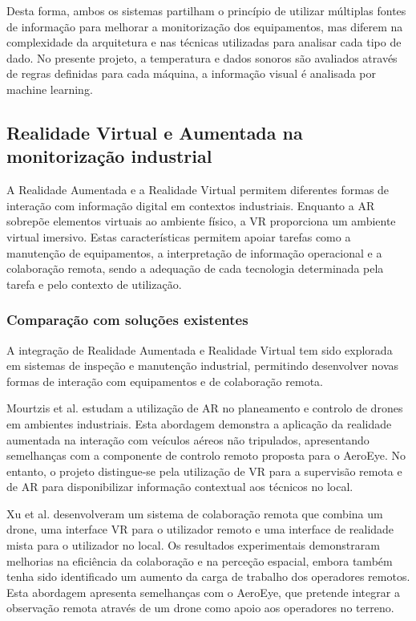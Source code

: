 \documentclass[conference,a4paper]{IEEEtran}
\begin{document}
Desta forma, ambos os sistemas partilham o princípio de utilizar múltiplas fontes de informação para melhorar a monitorização dos equipamentos, mas diferem na complexidade da arquitetura e nas técnicas utilizadas para analisar cada tipo de dado. No presente projeto, a temperatura e dados sonoros são avaliados através de regras definidas para cada máquina, a informação visual é analisada por machine learning.

\subsection{Realidade Virtual e Aumentada na monitorização industrial}
A Realidade Aumentada e a Realidade Virtual permitem diferentes formas de interação com informação digital em contextos industriais. Enquanto a AR sobrepõe elementos virtuais ao ambiente físico, a VR proporciona um ambiente virtual imersivo. Estas características permitem apoiar tarefas como a manutenção de equipamentos, a interpretação de informação operacional e a colaboração remota, sendo a adequação de cada tecnologia determinada pela tarefa e pelo contexto de utilização.

\subsubsection{Comparação com soluções existentes}
A integração de Realidade Aumentada e Realidade Virtual tem sido explorada em sistemas de inspeção e manutenção industrial, permitindo desenvolver novas formas de interação com equipamentos e de colaboração remota.

Mourtzis et al. \cite{Mourtzis02052024} estudam a utilização de AR no planeamento e controlo de drones em ambientes industriais. Esta abordagem demonstra a aplicação da realidade aumentada na interação com veículos aéreos não tripulados, apresentando semelhanças com a componente de controlo remoto proposta para o AeroEye. No entanto, o projeto distingue-se pela utilização de VR para a supervisão remota e de AR para disponibilizar informação contextual aos técnicos no local.

Xu et al. \cite{11355682} desenvolveram um sistema de colaboração remota que combina um drone, uma interface VR para o utilizador remoto e uma interface de realidade mista para o utilizador no local. Os resultados experimentais demonstraram melhorias na eficiência da colaboração e na perceção espacial, embora também tenha sido identificado um aumento da carga de trabalho dos operadores remotos. Esta abordagem apresenta semelhanças com o AeroEye, que pretende integrar a observação remota através de um drone como apoio aos operadores no terreno.
\end{document}
